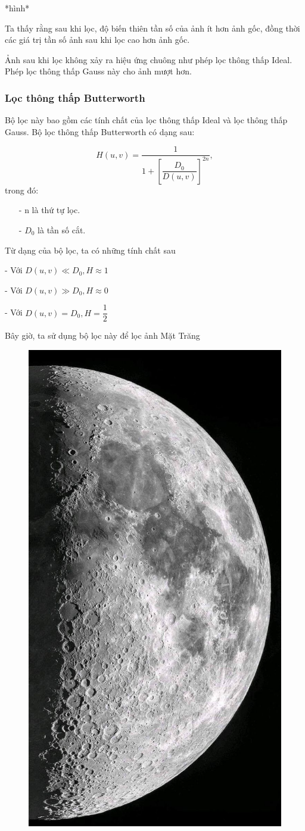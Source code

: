 \documentclass[12pt,a4paper]{report}
\numberwithin{equation}{section}
\theoremstyle{definition} %
\begin{document}
*hình*

Ta thấy rằng sau khi lọc, độ biến thiên tần số của ảnh ít hơn ảnh gốc, đồng thời các giá trị tần số ảnh sau khi lọc cao hơn ảnh gốc.

Ảnh sau khi lọc không xảy ra hiệu ứng chuông như phép lọc thông thấp Ideal. Phép lọc thông thấp Gauss này cho ảnh mượt hơn.
\subsubsection{Lọc thông thấp Butterworth}

Bộ lọc này bao gồm các tính chất của lọc thông thấp Ideal và lọc thông thấp Gauss. Bộ lọc thông thấp Butterworth có dạng sau:

\[H(u,v) = \frac{1}{1 + \left[\dfrac{D_0}{D(u,v)}\right]^{2n}},\]
trong đó: 
\begin{enumerate}
	\item[-] n là thứ tự lọc.
	\item[-] $D_0$ là tần số cắt.
\end{enumerate}

Từ dạng của bộ lọc, ta có những tính chất sau

- Với $D(u,v) \ll D_0, H\approx 1$

- Với $D(u,v) \gg D_0, H\approx 0$

- Với $D(u,v) = D_0, H= \dfrac{1}{2}$

Bây giờ, ta sử dụng bộ lọc này để lọc ảnh Mặt Trăng
\begin{figure}[H]
\centering
\includegraphics[width=0.4\linewidth]{img/moon.jpg}
\end{figure}
\end{document}
